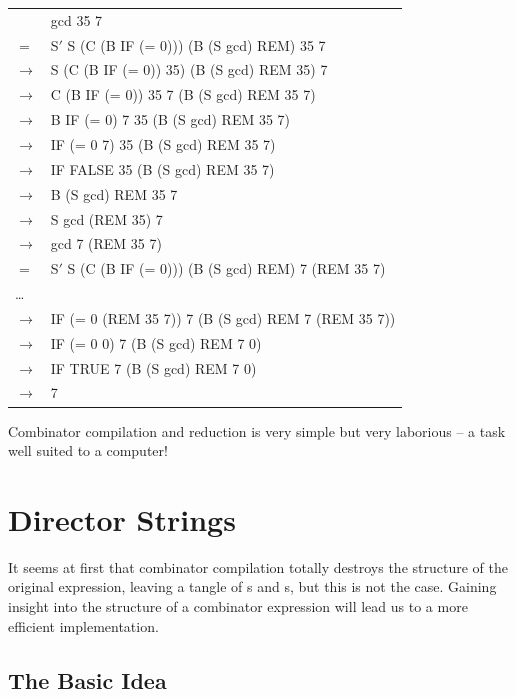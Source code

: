 \begin{mlcoded}
    \begin{tabular}{@{}l@{\;\;}l@{}}
        & gcd 35 7 \\
        $=$ & S$'$ S (C (B IF (= 0))) (B (S gcd) REM) 35 7 \\
        $\rightarrow$ & S (C (B IF (= 0)) 35) (B (S gcd) REM 35) 7 \\
        $\rightarrow$ & C (B IF (= 0)) 35 7 (B (S gcd) REM 35 7) \\
        $\rightarrow$ & B IF (= 0) 7 35 (B (S gcd) REM 35 7) \\
        $\rightarrow$ & IF (= 0 7) 35 (B (S gcd) REM 35 7) \\
        $\rightarrow$ & IF FALSE 35 (B (S gcd) REM 35 7) \\
        $\rightarrow$ & B (S gcd) REM 35 7 \\
        $\rightarrow$ & S gcd (REM 35) 7 \\
        $\rightarrow$ & gcd 7 (REM 35 7) \\
        $=$ & S$'$ S (C (B IF (= 0))) (B (S gcd) REM) 7 (REM 35 7) \\
        \ldots & \\
        $\rightarrow$ & IF (= 0 (REM 35 7)) 7 (B (S gcd) REM 7 (REM 35 7)) \\
        $\rightarrow$ & IF (= 0 0) 7 (B (S gcd) REM 7 0) \\
        $\rightarrow$ & IF TRUE 7 (B (S gcd) REM 7 0) \\
        $\rightarrow$ & 7
    \end{tabular}
\end{mlcoded}
Combinator compilation and reduction is very simple but very laborious -- a task well suited to a computer!

\section{Director Strings}

It seems at first that combinator compilation totally destroys the structure of the original expression, leaving a tangle of s and s, but this is not the case. Gaining insight into the structure of a combinator expression will lead us to a more efficient implementation.

\subsection{The Basic Idea}

